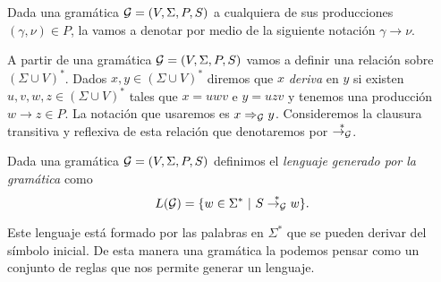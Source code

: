 \documentclass[tesis.tex]{subfiles}
\begin{document}
Dada una gramática ${\cal G} = (V, \Sigma, P, S)$ a cualquiera de sus producciones $(\gamma, \nu) \in P$, la vamos a denotar por medio de la siguiente notación $\gamma \to \nu$. 

A partir de una gramática ${\cal G} = (V, \Sigma, P, S)$ vamos a definir una relación sobre $(\Sigma \cup V)^*$. 
Dados $x,y \in (\Sigma \cup V)^*$ diremos que $x$ \emph{deriva} en $y$ si existen $u,v,w,z \in (\Sigma \cup V)^*$ tales que $x = uwv$ e $y=uzv$ y tenemos una producción $w \to z \in P$.
La notación que usaremos es $x \Rightarrow_{\cal G} y$. 
Consideremos la clausura transitiva y reflexiva de esta relación que denotaremos por $\overset{*}{\to_{\cal G}}$.



\begin{deff}
	Dada una gramática ${\cal G} = (V, \Sigma, P, S)$  definimos el \emph{lenguaje generado por la gramática} como
	\[
	L({\cal G}) = \{ w \in \Sigma^* \ | \ S \overset{*}{\to_{\cal G}} w   \}.
	\]
\end{deff}

Este lenguaje está formado por las palabras en $\Sigma^*$ que se pueden derivar del símbolo inicial.
De esta manera una gramática la podemos pensar como un conjunto de reglas que nos permite generar un lenguaje. 
 
\end{document}
